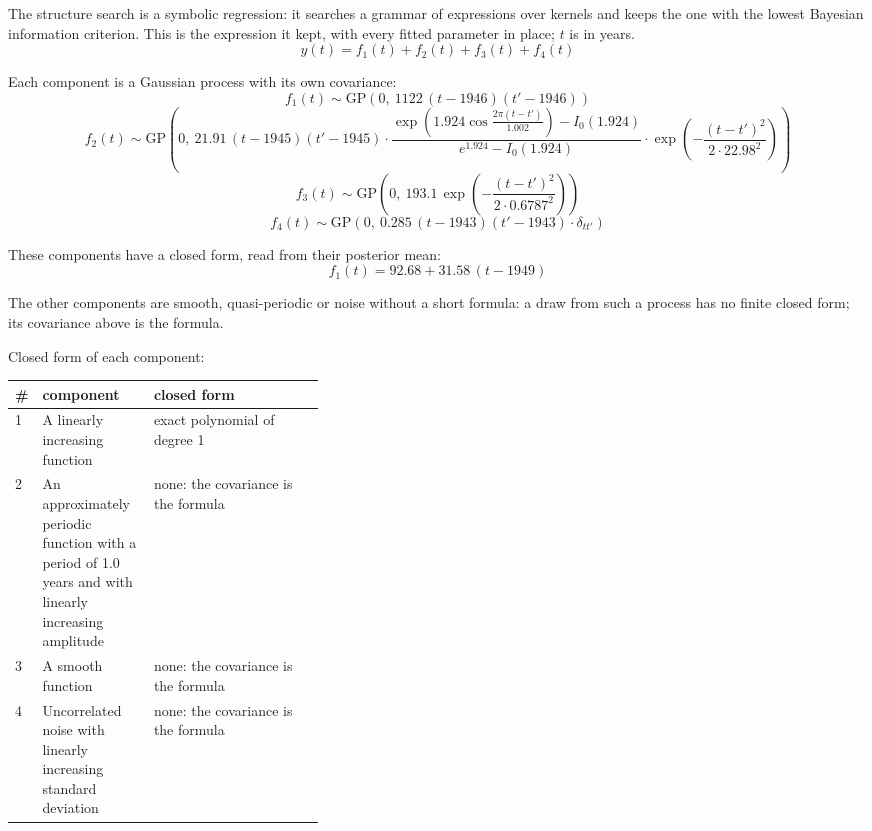 \documentclass[11pt,a4paper]{article}
\begin{document}
The structure search is a symbolic regression: it searches a grammar of expressions over kernels and keeps the one with the lowest Bayesian information criterion. This is the expression it kept, with every fitted parameter in place; $t$ is in years.
\begin{dmath*}
y(t) = f_{1}(t) + f_{2}(t) + f_{3}(t) + f_{4}(t)
\end{dmath*}

Each component is a Gaussian process with its own covariance:
\begin{dmath*}
f_{1}(t) \sim \mathrm{GP}\!\left(0,\ 1122\,(t - 1946)(t' - 1946)\right)
\end{dmath*}
\begin{dmath*}
f_{2}(t) \sim \mathrm{GP}\!\left(0,\ 21.91\,(t - 1945)(t' - 1945) \cdot \frac{\exp\!\left(1.924\cos\frac{2\pi (t - t')}{1.002}\right) - I_0(1.924)}{e^{1.924} - I_0(1.924)} \cdot \exp\!\left(-\frac{(t - t')^2}{2 \cdot 22.98^2}\right)\right)
\end{dmath*}
\begin{dmath*}
f_{3}(t) \sim \mathrm{GP}\!\left(0,\ 193.1\,\exp\!\left(-\frac{(t - t')^2}{2 \cdot 0.6787^2}\right)\right)
\end{dmath*}
\begin{dmath*}
f_{4}(t) \sim \mathrm{GP}\!\left(0,\ 0.285\,(t - 1943)(t' - 1943) \cdot \delta_{t t'}\right)
\end{dmath*}

These components have a closed form, read from their posterior mean:
\begin{dmath*}
f_{1}(t) = 92.68 + 31.58\,(t - 1949)
\end{dmath*}

The other components are smooth, quasi-periodic or noise without a short formula: a draw from such a process has no finite closed form; its covariance above is the formula.

Closed form of each component:

\begin{center}\footnotesize
\begin{tabular}{lp{0.36\linewidth}l}
\toprule
\# & component & closed form \\
\midrule
1 & A linearly increasing function & exact polynomial of degree 1 \\
2 & An approximately periodic function with a period of 1.0 years and with linearly increasing amplitude & none: the covariance is the formula \\
3 & A smooth function & none: the covariance is the formula \\
4 & Uncorrelated noise with linearly increasing standard deviation & none: the covariance is the formula \\
\bottomrule
\end{tabular}
\end{center}
\end{document}
